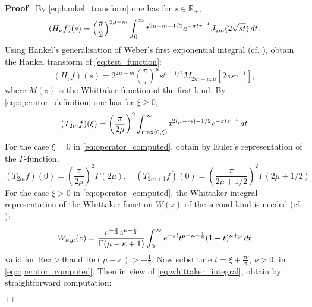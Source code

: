 \documentclass{article}
\newenvironment{proof}{\noindent\textbf{Proof\ }}{\hspace*{\fill}$\Box$\medskip}
\begin{document}
\begin{proof}
  By \eqref{eq:hankel_transform} one has for $s \in \mathbb{R}_+$,
  \begin{equation}
    (H_{\nu} f) (s) = \left( \frac{\pi}{2} \right)^{2 \mu - m} 
    \int_0^{\infty} t^{2 \mu - m - 1 / 2} e^{- \pi t \tau^{- 1}} J_{2 m}  (2
    \sqrt{st})  \hspace{0.17em} dt. \label{eq:hankel_computed}
  \end{equation}
  Using Hankel's generalisation of Weber's first exponential integral (cf.
  {\cite{31}}), obtain the Hankel transform of \eqref{eq:test_function}:
  \begin{equation}
    (H_{\nu} f) (s) = 2^{2 \mu - m} \left( \frac{\pi}{\tau} \right)^{\mu}
    s^{\mu - 1 / 2} M_{2 m - \mu, \mu}  [2 \pi s \tau^{- 1}],
    \label{eq:hankel_whittaker}
  \end{equation}
  where $M (z)$ is the Whittaker function of the first kind. By
  \eqref{eq:operator_definition} one has for $\xi \geq 0$,
  \begin{equation}
    (T_{2 m} f) (\xi) = \left( \frac{\pi}{2 \mu} \right)^2  \int_{\max (0,
    \xi)}^{\infty} t^{2 (\mu - m) - 1 / 2} e^{- \pi t \tau^{- 1}} 
    \hspace{0.17em} dt \label{eq:operator_computed}
  \end{equation}
  For the case $\xi = 0$ in \eqref{eq:operator_computed}, obtain by Euler's
  representation of the $\Gamma$-function,
  \begin{equation}
    (T_{2 m} f) (0) = \left( \frac{\pi}{2 \mu} \right)^2 \Gamma (2 \mu), \quad
    (T_{2 m + 1} f) (0) = \left( \frac{\pi}{2 \mu + 1 / 2} \right)^2 \Gamma (2
    \mu + 1 / 2) \label{eq:operator_zero}
  \end{equation}
  For the case $\xi > 0$ in \eqref{eq:operator_computed}, the Whittaker
  integral representation of the Whittaker function $W (z)$ of the second kind
  is needed (cf. {\cite{33}}):
  \begin{equation}
    W_{\kappa, \mu} (z) = \frac{e^{- \frac{z}{2}} z^{\kappa +
    \frac{1}{2}}}{\Gamma (\mu - \kappa + 1)}  \int_0^{\infty} e^{- zt} t^{\mu
    - \kappa - \frac{1}{2}}  (1 + t)^{\kappa + \mu}  \hspace{0.17em} dt
    \label{eq:whittaker_integral}
  \end{equation}
  valid for $\mathrm{Re} z > 0$ and $\mathrm{Re} (\mu - \kappa) > -
  \frac{1}{2}$. Now substitute $t = \xi + \frac{\tau \nu}{\pi}$, $\nu > 0$, in
  \eqref{eq:operator_computed}. Then in view of \eqref{eq:whittaker_integral},
  obtain by straightforward computation:

\end{proof}
\end{document}
